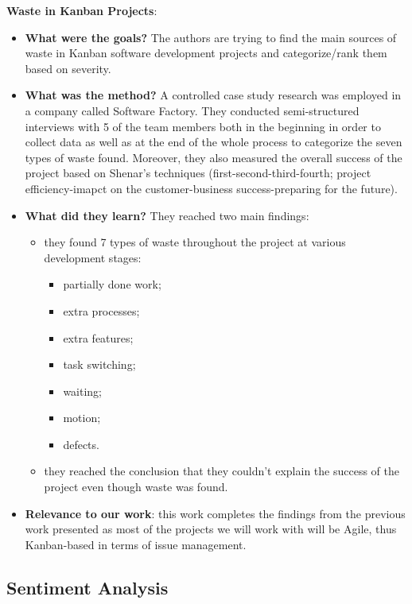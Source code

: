 \documentclass{mprop}
\begin{document}
\textbf{Waste in Kanban Projects}\cite{ikonen2010exploring}:
\begin{itemize}
  \item \textbf{What were the goals?}
    The authors are trying to find the main sources of waste in Kanban software
    development projects and categorize/rank them based on severity.
  \item \textbf{What was the method?}
    A controlled case study research was employed in a company called Software
    Factory. They conducted semi-structured interviews with 5 of the team
    members both in the beginning in order to collect data as well as at the end 
    of the whole process to categorize the seven types of waste found. Moreover,
    they also measured the overall success of the project based on Shenar's
    techniques (first-second-third-fourth; project efficiency-imapct on the
    customer-business success-preparing for the future).
  \item \textbf{What did they learn?}
    They reached two main findings:
      \begin{itemize}
        \item they found 7 types of waste throughout the project at various
          development stages:
            \begin{itemize}
              \item partially done work;
              \item extra processes;
              \item extra features;
              \item task switching;
              \item waiting;
              \item motion;
              \item defects.
            \end{itemize}
        \item they reached the conclusion that they couldn't explain the success
          of the project even though waste was found.
      \end{itemize}
  \item \textbf{Relevance to our work}: this work completes the findings 
    from the previous work presented as most of the projects we will work with
    will be Agile, thus Kanban-based in terms of issue management.
\end{itemize}

\subsection{Sentiment Analysis}
\end{document}
